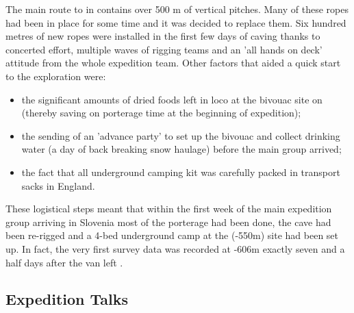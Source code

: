 The main route to  in  contains over 500
m of vertical pitches. Many of these ropes had been in place for some time and it was decided to replace them. Six hundred metres of new ropes were installed in the first few days of caving thanks to concerted effort, multiple waves of rigging teams and an 'all hands on deck' attitude
from the whole expedition team.  Other factors that aided a quick start to the
exploration were:



\begin{itemize}
\item the significant amounts of dried foods left in loco at the bivouac
site on  (thereby saving on porterage time at the beginning of expedition); 
\item the sending of an 'advance party' to set up the bivouac and collect drinking water (a day of back breaking snow haulage) before the main group arrived; 
\item the fact that all underground camping kit was carefully packed in transport sacks in England. 
\end{itemize}
These logistical steps meant that within the first week of the main expedition group arriving in Slovenia most of the porterage had been done, the cave had been re-rigged and a 4-bed underground camp at the  (-550m) site had been set up. In fact, the very first survey
data was recorded at -606m exactly seven and a half days after the van left .


\subsection{Expedition Talks}

